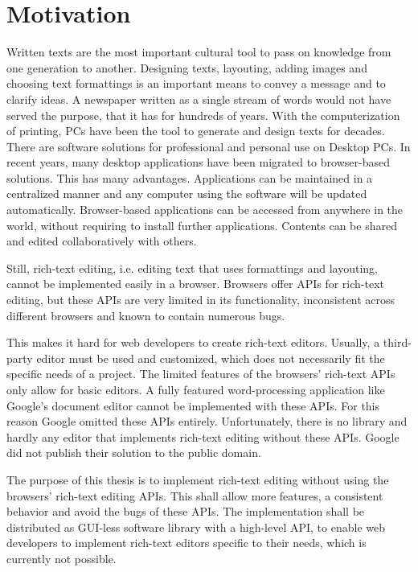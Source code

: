 \section{Motivation}

Written texts are the most important cultural tool to pass on knowledge from one generation to another. Designing texts, layouting, adding images and choosing text formattings is an important means to convey a message and to clarify ideas. A newspaper written as a single stream of words would not have served the purpose, that it has for hundreds of years.
With the computerization of printing, PCs have been the tool to generate and design texts for decades. There are software solutions for professional and personal use on Desktop PCs.
In recent years, many desktop applications have been migrated to browser-based solutions. This has many advantages. Applications can be maintained in a centralized manner and any computer using the software will be updated automatically. Browser-based applications can be accessed from anywhere in the world, without requiring to install further applications. Contents can be shared and edited collaboratively with others.

Still, rich-text editing, i.e. editing text that uses formattings and layouting, cannot be implemented easily in a browser. Browsers offer APIs for rich-text editing, but these APIs are very limited in its functionality, inconsistent across different browsers and known to contain numerous bugs.

This makes it hard for web developers to create rich-text editors. Usually, a third-party editor must be used and customized, which does not necessarily fit the specific needs of a project. The limited features of the browsers' rich-text APIs only allow for basic editors. A fully featured word-processing application like Google's document editor cannot be implemented with these APIs. For this reason Google omitted these APIs entirely. Unfortunately, there is no library and hardly any editor that implements rich-text editing without these APIs. Google did not publish their solution to the public domain.

The purpose of this thesis is to implement rich-text editing without using the browsers' rich-text editing APIs. This shall allow more features, a consistent behavior and avoid the bugs of these APIs. The implementation shall be distributed as GUI-less software library with a high-level API, to enable web developers to implement rich-text editors specific to their needs, which is currently not possible.


